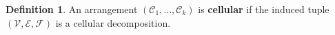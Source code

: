 \documentclass[11pt,reqno]{amsart}
\theoremstyle{plain}
\newtheorem{theorem}[subsection]{Theorem}
\theoremstyle{definition}
\newtheorem{definition}[subsection]{Definition}
\theoremstyle{remark}
\numberwithin{equation}{subsection}
\newcommand*{\bbB}{\mathbb{B}}
\newcommand*{\bbD}{\mathbb{D}}
\newcommand*{\calC}{\mathcal{C}}
\newcommand*{\calE}{\mathcal{E}}
\newcommand*{\calF}{\mathcal{F}}
\newcommand*{\calG}{\mathcal{G}}
\newcommand*{\calS}{\mathcal{S}}
\newcommand*{\calV}{\mathcal{V}}
\DeclareMathOperator{\interior}{int}
\begin{document}

\begin{definition}\label{def:cellular}
    An arrangement $(\calC_1,\dots,\calC_k)$ is \textbf{cellular} if the induced tuple $(\calV,\calE,\calF)$ is a cellular decomposition.
\end{definition}


    
    
    
    
\end{document}
